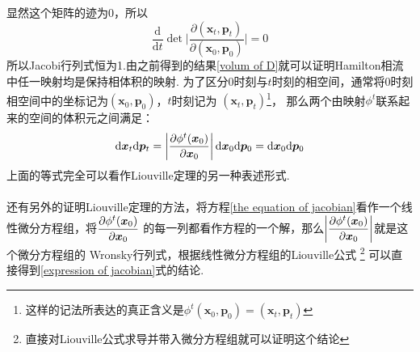     显然这个矩阵的迹为0，所以
    \begin{equation}
        \frac {\mathrm{d}}{\mathrm{d}t} \det \bigg|\frac {\partial (\bm{x}_t,\bm{p}_t)}{\partial (\bm{x}_0,\bm{p}_0)} \bigg| = 0
    \end{equation}
    所以Jacobi行列式恒为1.由之前得到的结果\ref{volum of D}就可以证明Hamilton相流中任一映射均是保持相体积的映射.
    为了区分0时刻与$t$时刻的相空间，通常将0时刻相空间中的坐标记为$(\bm{x}_0, \bm{p}_0)$，$t$时刻记为
    $(\bm{x}_t,\bm{p}_{t})$\footnote{这样的记法所表达的真正含义是$\phi^t(\bm{x}_0, \bm{p}_0) = (\bm{x}_t, \bm{p}_t)$}，
    那么两个由映射$\phi^t$联系起来的空间的体积元之间满足：
    \begin{equation}
        \mathrm{d}\bm{x}_t \mathrm{d}\bm{p}_t = \left|\frac{\partial{\phi^t(\bm{x}_0)}}{\partial{\bm{x}_0}}\right|\mathrm{d}\bm{x}_0 \mathrm{d}\bm{p}_0 = \mathrm{d} \bm{x}_0\mathrm{d} \bm{p}_0
    \end{equation}
    上面的等式完全可以看作Liouville定理的另一种表述形式.
    \paragraph{}
    还有另外的证明Liouville定理的方法，将方程\ref{the equation of jacobian}看作一个线性微分方程组，将$\displaystyle\frac{\partial{\phi^t(\bm{x}_0)}}{\partial{\bm{x}_0}}$
    的每一列都看作方程的一个解，那么$\displaystyle\left|\frac{\partial{\phi^t(\bm{x}_0)}}{\partial{\bm{x}_0}}\right|$就是这个微分方程组的
    Wronsky行列式，根据线性微分方程组的Liouville公式
    \footnote{直接对Liouville公式求导并带入微分方程组就可以证明这个结论}
    可以直接得到\ref{expression of jacobian}式的结论.
